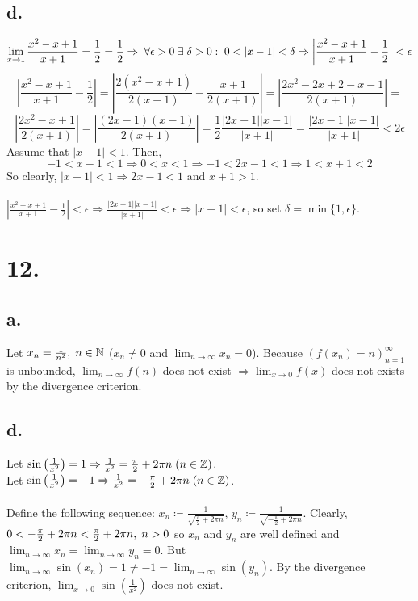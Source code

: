 \documentclass[11pt]{article}
\begin{document}
\subsection*{d.}
\[\lim_{x\to1} \frac{x^2-x+1}{x+1}=\frac{1}{2} = \frac{1}{2}\Rightarrow \hspace{1mm} \forall\epsilon>0 \hspace{1mm} \exists\hspace{1mm}\delta>0:\hspace{1mm}0<|x-1|<\delta\Rightarrow\left|\frac{x^2-x+1}{x+1}-\frac{1}{2}\right| < \epsilon\]
\[\left|\frac{x^2-x+1}{x+1}-\frac{1}{2}\right|=\left|\frac{2(x^2-x+1)}{2(x+1)}-\frac{x+1}{2(x+1)}\right|=\left|\frac{2x^2-2x+2-x-1}{2(x+1)}\right|=\]
\[\left|\frac{2x^2-x+1}{2(x+1)}\right|=\left|\frac{(2x-1)(x-1)}{2(x+1)}\right|=\frac{1}{2}\frac{|2x-1||x-1|}{|x+1|}=\frac{|2x-1||x-1|}{|x+1|} < 2\epsilon\]
Assume that $|x-1| < 1$. Then,
\[-1<x-1<1\Rightarrow 0<x<1\Rightarrow -1<2x-1<1 \Rightarrow 1 < x+1 < 2\]
So clearly, $|x-1|< 1 \Rightarrow 2x-1 < 1$ and $x+1 > 1$. \\
\\
$\left|\frac{x^2-x+1}{x+1}-\frac{1}{2}\right| < \epsilon \Rightarrow \frac{|2x-1||x-1|}{|x+1|} < \epsilon \Rightarrow |x-1| < \epsilon$, so set $\delta = \min\{1,\epsilon\}$.

\section*{12.}
\subsection*{a.}
Let $x_n = \frac{1}{n^2},\hspace{1mm} n \in \mathbb{N}$ ($x_n\neq0$ and $\lim_{n\to\infty}x_n = 0$). Because $(f(x_n)=n)_{n=1}^\infty$ is unbounded, $\lim_{n\to\infty}f(n)$ does not exist $\Rightarrow \lim_{x\to0}f(x)$ does not exists by the divergence criterion.

\subsection*{d.}
Let $\sin\left(\frac{1}{x^2}\right)=1\Rightarrow \frac{1}{x^2} = \frac{\pi}{2} + 2\pi n \hspace{1mm} (n\in\mathbb{Z})$. \\
Let $\sin\left(\frac{1}{x^2}\right)=-1\Rightarrow \frac{1}{x^2} = -\frac{\pi}{2} + 2\pi n \hspace{1mm} (n\in\mathbb{Z})$. \\
\\
Define the following sequence: $x_n\coloneqq \frac{1}{\sqrt{\frac{\pi}{2}+2\pi n}}$, $y_n\coloneqq \frac{1}{\sqrt{-\frac{\pi}{2}+2\pi n}}$. Clearly, $0 < -\frac{\pi}{2} + 2\pi n < \frac{\pi}{2}+2\pi n, \hspace{1mm} n>0$ so $x_n$ and $y_n$ are well defined and $\lim_{n\to\infty}x_n=\lim_{n\to\infty}y_n=0$. But $\lim_{n\to\infty}\sin(x_n)=1 \neq -1 = \lim_{n\to\infty}\sin(y_n)$. By the divergence criterion, $\lim_{x\to0}\sin\left(\frac{1}{x^2}\right)$ does not exist.
\end{document}
